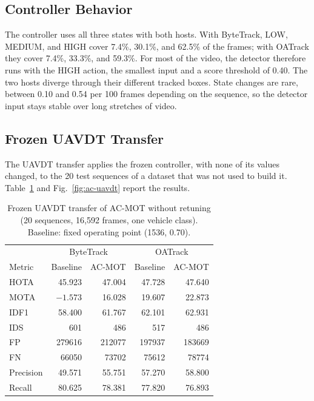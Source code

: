 \subsection{Controller Behavior}\label{sec:ac-res-behavior}
The controller uses all three states with both hosts. With ByteTrack, LOW, MEDIUM, and HIGH cover 7.4\%, 30.1\%, and 62.5\% of the frames; with OATrack they cover 7.4\%, 33.3\%, and 59.3\%. For most of the video, the detector therefore runs with the HIGH action, the smallest input and a score threshold of 0.40. The two hosts diverge through their different tracked boxes. State changes are rare, between 0.10 and 0.54 per 100 frames depending on the sequence, so the detector input stays stable over long stretches of video.

\subsection{Frozen UAVDT Transfer}\label{sec:ac-res-uavdt}
The UAVDT transfer applies the frozen controller, with none of its values changed, to the 20 test sequences of a dataset that was not used to build it. Table~\ref{tab:ac-uavdt} and Fig.~\ref{fig:ac-uavdt} report the results.

\begin{table}[tbp]
\centering
\caption{Frozen UAVDT transfer of AC-MOT without retuning (20 sequences, 16,592 frames, one vehicle class). Baseline: fixed operating point (1536, 0.70).}
\label{tab:ac-uavdt}
\begin{tabular}{lrrrr}
\toprule
 & \multicolumn{2}{c}{ByteTrack} & \multicolumn{2}{c}{OATrack}\\
Metric & Baseline & AC-MOT & Baseline & AC-MOT\\
\midrule
HOTA & 45.923 & 47.004 & 47.728 & 47.640\\
MOTA & $-1.573$ & 16.028 & 19.607 & 22.873\\
IDF1 & 58.400 & 61.767 & 62.101 & 62.931\\
IDS & 601 & 486 & 517 & 486\\
FP & 279616 & 212077 & 197937 & 183669\\
FN & 66050 & 73702 & 75612 & 78774\\
Precision & 49.571 & 55.751 & 57.270 & 58.800\\
Recall & 80.625 & 78.381 & 77.820 & 76.893\\
\bottomrule
\end{tabular}
\end{table}

